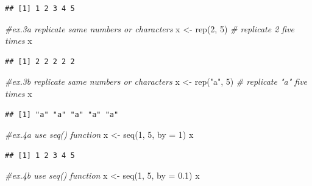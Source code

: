 \documentclass[
]{book}
\newenvironment{Shaded}{\begin{snugshade}}{\end{snugshade}}
\newcommand{\AttributeTok}[1]{\textcolor[rgb]{0.77,0.63,0.00}{#1}}
\newcommand{\CommentTok}[1]{\textcolor[rgb]{0.56,0.35,0.01}{\textit{#1}}}
\newcommand{\DecValTok}[1]{\textcolor[rgb]{0.00,0.00,0.81}{#1}}
\newcommand{\FloatTok}[1]{\textcolor[rgb]{0.00,0.00,0.81}{#1}}
\newcommand{\FunctionTok}[1]{\textcolor[rgb]{0.00,0.00,0.00}{#1}}
\newcommand{\NormalTok}[1]{#1}
\newcommand{\OtherTok}[1]{\textcolor[rgb]{0.56,0.35,0.01}{#1}}
\newcommand{\StringTok}[1]{\textcolor[rgb]{0.31,0.60,0.02}{#1}}
\begin{document}
\begin{verbatim}
## [1] 1 2 3 4 5
\end{verbatim}

\begin{Shaded}
\begin{Highlighting}[]
\CommentTok{\#ex.3a replicate same numbers or characters}
\NormalTok{x }\OtherTok{\textless{}{-}} \FunctionTok{rep}\NormalTok{(}\DecValTok{2}\NormalTok{, }\DecValTok{5}\NormalTok{) }\CommentTok{\# replicate 2 five times}
\NormalTok{x}
\end{Highlighting}
\end{Shaded}

\begin{verbatim}
## [1] 2 2 2 2 2
\end{verbatim}

\begin{Shaded}
\begin{Highlighting}[]
\CommentTok{\#ex.3b replicate same numbers or characters}
\NormalTok{x }\OtherTok{\textless{}{-}} \FunctionTok{rep}\NormalTok{(}\StringTok{"a"}\NormalTok{, }\DecValTok{5}\NormalTok{) }\CommentTok{\# replicate "a" five times}
\NormalTok{x}
\end{Highlighting}
\end{Shaded}

\begin{verbatim}
## [1] "a" "a" "a" "a" "a"
\end{verbatim}

\begin{Shaded}
\begin{Highlighting}[]
\CommentTok{\#ex.4a use seq() function}
\NormalTok{x }\OtherTok{\textless{}{-}} \FunctionTok{seq}\NormalTok{(}\DecValTok{1}\NormalTok{, }\DecValTok{5}\NormalTok{, }\AttributeTok{by =} \DecValTok{1}\NormalTok{)}
\NormalTok{x}
\end{Highlighting}
\end{Shaded}

\begin{verbatim}
## [1] 1 2 3 4 5
\end{verbatim}

\begin{Shaded}
\begin{Highlighting}[]
\CommentTok{\#ex.4b use seq() function}
\NormalTok{x }\OtherTok{\textless{}{-}} \FunctionTok{seq}\NormalTok{(}\DecValTok{1}\NormalTok{, }\DecValTok{5}\NormalTok{, }\AttributeTok{by =} \FloatTok{0.1}\NormalTok{)}
\NormalTok{x}
\end{Highlighting}
\end{Shaded}
\end{document}
